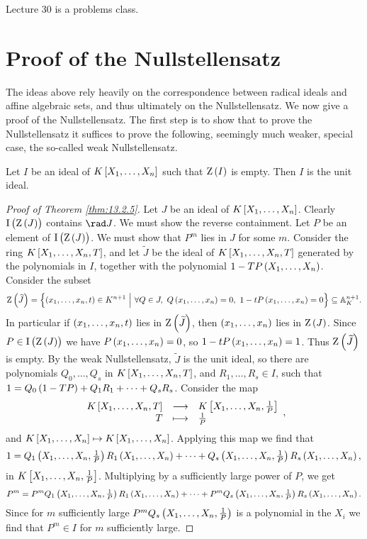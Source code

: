 
Lecture 30 is a problems class.

\pagebreak

\appendix

\section{Proof of the Nullstellensatz}

The ideas above rely heavily on the correspondence between radical ideals and affine algebraic sets, and thus ultimately on the Nullstellensatz. We now give a proof of the Nullstellensatz. The first step is to show that to prove the Nullstellensatz it suffices to prove the following, seemingly much weaker, special case, the so-called weak Nullstellensatz.

\begin{theorem}
\label{thm:13.3.1}
Let $ I $ be an ideal of $ K\sbr{X_1, \dots, X_n} $ such that $ \Z\br{I} $ is empty. Then $ I $ is the unit ideal.
\end{theorem}

\begin{proof}[Proof of Theorem \ref{thm:13.2.5}]
Let $ J $ be an ideal of $ K\sbr{X_1, \dots, X_n} $. Clearly $ \I\br{\Z\br{J}} $ contains $ \rad J $. We must show the reverse containment. Let $ P $ be an element of $ \I\br{\Z\br{J}} $. We must show that $ P^m $ lies in $ J $ for some $ m $. Consider the ring $ K\sbr{X_1, \dots, X_n, T} $, and let $ \widetilde{J} $ be the ideal of $ K\sbr{X_1, \dots, X_n, T} $ generated by the polynomials in $ I $, together with the polynomial $ 1 - TP\br{X_1, \dots, X_n} $. Consider the subset
$$ \Z\br{\widetilde{J}} = \cbr{\br{x_1, \dots, x_n, t} \in K^{n + 1} \st \forall Q \in J, \ Q\br{x_1, \dots, x_n} = 0, \ 1 - tP\br{x_1, \dots, x_n} = 0} \subseteq \AA_K^{n + 1}. $$
In particular if $ \br{x_1, \dots, x_n, t} $ lies in $ \Z\br{\widetilde{J}} $, then $ \br{x_1, \dots, x_n} $ lies in $ \Z\br{J} $. Since $ P \in \I\br{\Z\br{J}} $ we have $ P\br{x_1, \dots, x_n} = 0 $, so $ 1 - tP\br{x_1, \dots, x_n} = 1 $. Thus $ \Z\br{\widetilde{J}} $ is empty. By the weak Nullstellensatz, $ \widetilde{J} $ is the unit ideal, so there are polynomials $ Q_0, \dots, Q_s $ in $ K\sbr{X_1, \dots, X_n, T} $, and $ R_1, \dots, R_s \in I $, such that $ 1 = Q_0\br{1 - TP} + Q_1R_1 + \dots + Q_sR_s $. Consider the map
$$ \function{K\sbr{X_1, \dots, X_n, T}}{K\sbr{X_1, \dots, X_n, \tfrac{1}{P}}}{T}{\tfrac{1}{P}}, $$
and $ K\sbr{X_1, \dots, X_n} \mapsto K\sbr{X_1, \dots, X_n} $. Applying this map we find that
$$ 1 = Q_1\br{X_1, \dots, X_n, \tfrac{1}{P}}R_1\br{X_1, \dots, X_n} + \dots + Q_s\br{X_1, \dots, X_n, \tfrac{1}{P}}R_s\br{X_1, \dots, X_n}, $$
in $ K\sbr{X_1, \dots, X_n, \tfrac{1}{P}} $. Multiplying by a sufficiently large power of $ P $, we get
$$ P^m = P^mQ_1\br{X_1, \dots, X_n, \tfrac{1}{P}}R_1\br{X_1, \dots, X_n} + \dots + P^mQ_s\br{X_1, \dots, X_n, \tfrac{1}{P}}R_s\br{X_1, \dots, X_n}. $$
Since for $ m $ sufficiently large $ P^mQ_s\br{X_1, \dots, X_n, \tfrac{1}{P}} $ is a polynomial in the $ X_i $ we find that $ P^m \in I $ for $ m $ sufficiently large.
\end{proof}

